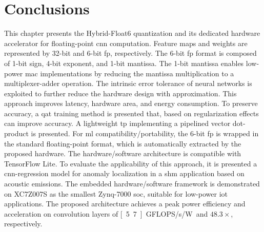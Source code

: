 \section{Conclusions}
\label{sec:conclusions}
This chapter presents the Hybrid-Float6 quantization and its dedicated hardware accelerator for floating-point \gls{cnn} computation. Feature maps and weights are represented by 32-bit and 6-bit \gls{fp}, respectively. The 6-bit \gls{fp} format is composed of 1-bit sign, 4-bit exponent, and 1-bit mantissa. The 1-bit mantissa enables low-power \gls{mac} implementations by reducing the mantissa multiplication to a multiplexer-adder operation. The intrinsic error tolerance of neural networks is exploited to further reduce the hardware design with approximation. This approach improves latency, hardware area, and energy consumption. To preserve accuracy, a \gls{qat} training method is presented that, based on regularization effects can improve accuracy. A lightweight \gls{tp} implementing a pipelined vector dot-product is presented. For \gls{ml} compatibility/portability, the 6-bit \gls{fp} is wrapped in the standard floating-point format, which is automatically extracted by the proposed hardware. The hardware/software architecture is compatible with TensorFlow Lite. To evaluate the applicability of this approach, it is presented a \gls{cnn}-regression model for anomaly localization in a \gls{shm} application based on acoustic emissions. The embedded hardware/software framework is demonstrated on XC7Z007S as the smallest Zynq-7000 \gls{soc}, suitable for low-power \gls{iot} applications. The proposed architecture achieves a peak power efficiency and acceleration on convolution layers of \unit[5.7]{GFLOPS/s/W} and $48.3\times$, respectively.